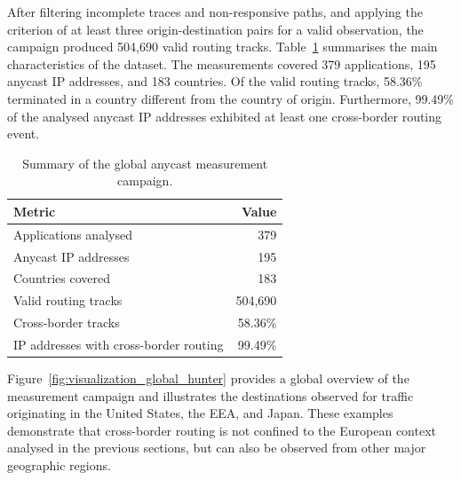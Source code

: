 \documentclass[
A4paper,                %
twoside,                %
openright,              %
chapterprefix=true,     %
12pt,                   %
headings=normal,        %
titlepage=on            %
]{book}
\begin{document}
After filtering incomplete traces and non-responsive paths, and applying the criterion of at least three origin-destination pairs for a valid observation, the campaign produced 504,690 valid routing tracks. Table~\ref{tab:global_hunter_summary} summarises the main characteristics of the dataset. The measurements covered 379 applications, 195 anycast IP addresses, and 183 countries. Of the valid routing tracks, 58.36\% terminated in a country different from the country of origin. Furthermore, 99.49\% of the analysed anycast IP addresses exhibited at least one cross-border routing event.

\begin{table}[ht]
    \centering
    \small
    \caption{Summary of the global anycast measurement campaign.}
    \label{tab:global_hunter_summary}
    \begin{tabular}{lr}
        \toprule
        \textbf{Metric} & \textbf{Value} \\
        \midrule
        Applications analysed & 379 \\
        Anycast IP addresses & 195 \\
        Countries covered & 183 \\
        Valid routing tracks & 504,690 \\
        Cross-border tracks & 58.36\% \\
        IP addresses with cross-border routing & 99.49\% \\
        \bottomrule
    \end{tabular}
\end{table}

Figure~\ref{fig:visualization_global_hunter} provides a global overview of the measurement campaign and illustrates the destinations observed for traffic originating in the United States, the EEA, and Japan. These examples demonstrate that cross-border routing is not confined to the European context analysed in the previous sections, but can also be observed from other major geographic regions.
\end{document}
